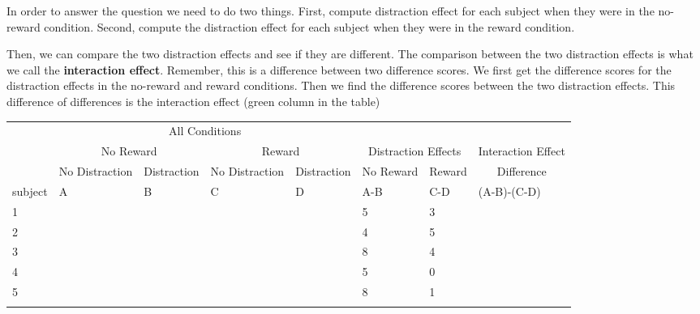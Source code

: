 \documentclass[
]{book}
\begin{document}
In order to answer the question we need to do two things. First, compute distraction effect for each subject when they were in the no-reward condition. Second, compute the distraction effect for each subject when they were in the reward condition.

Then, we can compare the two distraction effects and see if they are different. The comparison between the two distraction effects is what we call the \textbf{interaction effect}. Remember, this is a difference between two difference scores. We first get the difference scores for the distraction effects in the no-reward and reward conditions. Then we find the difference scores between the two distraction effects. This difference of differences is the interaction effect (green column in the table)

\begin{table}
\centering
\begin{tabular}{l|>{}l|>{}l|>{}l|>{}l|l|l|>{}l}
\hline
\multicolumn{1}{c|}{ } & \multicolumn{4}{c|}{ All Conditions} & \multicolumn{3}{c}{ } \\
\cline{2-5}
\multicolumn{1}{c|}{ } & \multicolumn{2}{c|}{No Reward} & \multicolumn{2}{c|}{Reward} & \multicolumn{2}{c|}{ Distraction Effects } & \multicolumn{1}{c}{Interaction Effect } \\
\cline{2-3} \cline{4-5} \cline{6-7} \cline{8-8}
\multicolumn{1}{c|}{ } & \multicolumn{1}{c|}{No Distraction} & \multicolumn{1}{c|}{Distraction} & \multicolumn{1}{c|}{No Distraction} & \multicolumn{1}{c|}{Distraction} & \multicolumn{1}{c|}{No Reward} & \multicolumn{1}{c|}{Reward} & \multicolumn{1}{c}{Difference} \\
\cline{2-2} \cline{3-3} \cline{4-4} \cline{5-5} \cline{6-6} \cline{7-7} \cline{8-8}
subject & A & B & C & D & A-B & C-D & (A-B)-(C-D)\\
\hline
1 & \cellcolor{yellow}{10} & \cellcolor{lightblue}{5} & \cellcolor{yellow}{12} & \cellcolor{lightblue}{9} & 5 & 3 & \cellcolor{lightgreen}{2}\\
\hline
2 & \cellcolor{yellow}{8} & \cellcolor{lightblue}{4} & \cellcolor{yellow}{13} & \cellcolor{lightblue}{8} & 4 & 5 & \cellcolor{lightgreen}{-1}\\
\hline
3 & \cellcolor{yellow}{11} & \cellcolor{lightblue}{3} & \cellcolor{yellow}{14} & \cellcolor{lightblue}{10} & 8 & 4 & \cellcolor{lightgreen}{4}\\
\hline
4 & \cellcolor{yellow}{9} & \cellcolor{lightblue}{4} & \cellcolor{yellow}{11} & \cellcolor{lightblue}{11} & 5 & 0 & \cellcolor{lightgreen}{5}\\
\hline
5 & \cellcolor{yellow}{10} & \cellcolor{lightblue}{2} & \cellcolor{yellow}{13} & \cellcolor{lightblue}{12} & 8 & 1 & \cellcolor{lightgreen}{7}\\
\hline
\cellcolor{lightgreen}{Means} & \cellcolor{lightgreen}{} & \cellcolor{lightgreen}{} & \cellcolor{lightgreen}{} & \cellcolor{lightgreen}{} & \cellcolor{lightgreen}{6} & \cellcolor{lightgreen}{2.6} & \cellcolor{lightgreen}{3.4}\\
\hline
\end{tabular}
\end{table}
\end{document}
